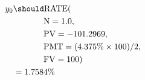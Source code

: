 \begin{align*}
y_{0}&\should\text{RATE}(\\
	&\hspace{.5in}\text{N}=1.0,\\
	&\hspace{.5in}\text{PV}=-101.2969,\\
	&\hspace{.5in}\text{PMT}=(4.375\%\times 100)/2,\\
	&\hspace{.5in}\text{FV}=100)\\
	&=1.7584\%
\end{align*}
